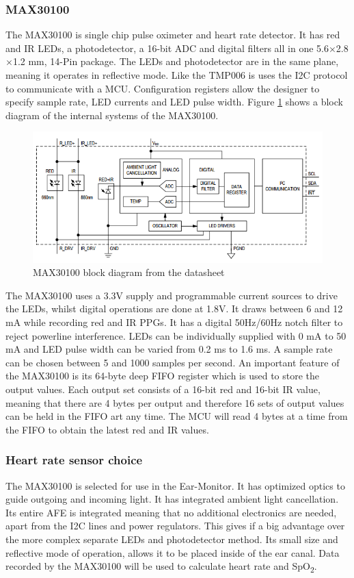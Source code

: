 \subsubsection{MAX30100} 
The MAX30100 is single chip pulse oximeter and heart rate detector. It has red and IR LEDs, a photodetector, a 16-bit ADC and digital filters all in one 5.6$\times$2.8$\times$1.2 mm, 14-Pin package. The LEDs and photodetector are in the same plane, meaning it operates in reflective mode. Like the TMP006 is uses the I2C protocol to communicate with a MCU. Configuration registers allow the designer to specify sample rate, LED currents and LED pulse width. Figure \ref{fig:MAX30100_Diagram} shows a block diagram of the internal systems of the MAX30100.

\begin{figure}[H]
   \centering
   \includegraphics[scale=1]{figs/MAX30100_Diagram.png}
   \caption{MAX30100 block diagram from the datasheet}
   \label{fig:MAX30100_Diagram}
\end{figure}

The MAX30100 uses a 3.3V supply and programmable current sources to drive the LEDs, whilst digital operations are done at 1.8V. It draws between 6 and 12 mA while recording red and IR PPGs. It has a digital 50Hz/60Hz notch filter to reject powerline interference. LEDs can be individually supplied with 0 mA to 50 mA and LED pulse width can be varied from 0.2 ms to 1.6 ms. A sample rate can be chosen between 5 and 1000 samples per second. An important feature of the MAX30100 is its 64-byte deep FIFO register which is used to store the output values. Each output set consists of a 16-bit red and 16-bit IR value, meaning that there are 4 bytes per output and therefore 16 sets of output values can be held in the FIFO art any time. The MCU will read 4 bytes at a time from the FIFO to obtain the latest red and IR values.

\subsubsection{Heart rate sensor choice}
The MAX30100 is selected for use in the Ear-Monitor. It has optimized optics to guide outgoing and incoming light. It has integrated ambient light cancellation. Its entire AFE is integrated meaning that no additional electronics are needed, apart from the I2C lines and power regulators. This gives if a big advantage over the more complex separate LEDs and photodetector method. Its small size and reflective mode of operation, allows it to be placed inside of the ear canal. Data recorded by the MAX30100 will be used to calculate heart rate and SpO\textsubscript{2}. 

